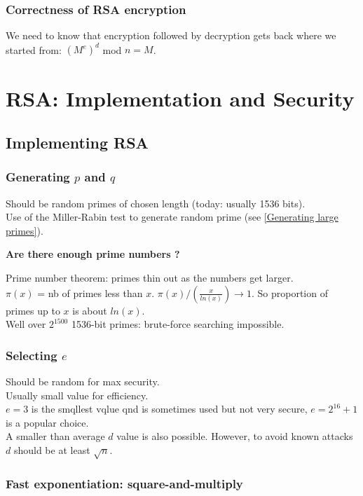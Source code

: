 \documentclass{article}
\begin{document}
\subsubsection{Correctness of RSA encryption}

We need to know that encryption followed by decryption gets back where we started from: $(M^e)^d$ mod $n = M$.

\newpage \section{RSA: Implementation and Security}

\subsection{Implementing RSA}

\subsubsection{Generating $p$ and $q$}

Should be random primes of chosen length (today: usually 1536 bits).\\
Use of the Miller-Rabin test to generate random prime (see \ref{Generating large primes}). 

\textbf{Are there enough prime numbers ?}

Prime number theorem: primes thin out as the numbers get larger.\\
$\pi(x)$ = nb of primes less than $x$. $\pi(x)/(\frac{x}{ln(x)}) \longrightarrow 1 $. So proportion of primes up to $x$ is about $ln(x)$.\\
Well over $2^{1500}$ 1536-bit primes: brute-force searching impossible.

\subsubsection{Selecting $e$}

Should be random for max security.\\
Usually small value for efficiency.\\
$e=3$ is the smqllest vqlue qnd is sometimes used but not very secure, $e=2^{16}+1$ is a popular choice.\\
A smaller than average $d$ value is also possible. However, to avoid known attacks $d$ should be at least $\sqrt{n}$.

\subsubsection{Fast exponentiation: square-and-multiply}
\end{document}
